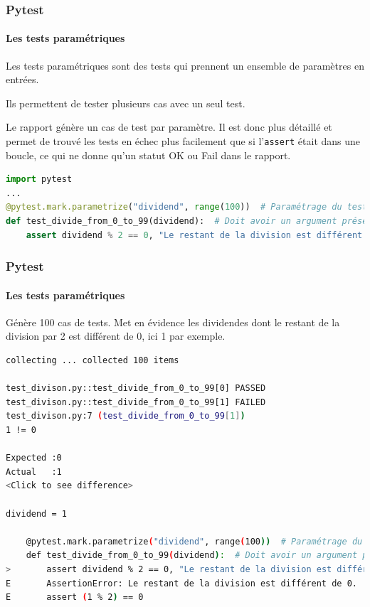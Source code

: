 \documentclass{beamer}
\begin{document}
    \begin{frame}[fragile]
        \frametitle{Pytest}
        \framesubtitle{Les tests paramétriques}
        \transdissolve
        Les tests paramétriques sont des tests qui prennent un ensemble de paramètres en entrées.

        Ils permettent de tester plusieurs cas avec un seul test.

        Le rapport génère un cas de test par paramètre. Il est donc plus détaillé et permet de trouvé
        les tests en échec plus facilement que si l'\lstinline {assert} était dans une boucle, ce qui ne donne qu'un statut OK ou Fail dans le rapport.
        \begin{lstlisting}[language=Python]
import pytest
...
@pytest.mark.parametrize("dividend", range(100))  # Paramétrage du test
def test_divide_from_0_to_99(dividend):  # Doit avoir un argument présent dans le paramétrage
    assert dividend % 2 == 0, "Le restant de la division est différent de 0."
        \end{lstlisting}
    \end{frame}

    \begin{frame}[fragile]
        \frametitle{Pytest}
        \framesubtitle{Les tests paramétriques}
        \transdissolve
        Génère 100 cas de tests. Met en évidence les dividendes dont le restant de la division par 2 est différent de 0, ici 1 par exemple.
        \begin{lstlisting}[language=sh]
collecting ... collected 100 items

test_divison.py::test_divide_from_0_to_99[0] PASSED                      [  1%]
test_divison.py::test_divide_from_0_to_99[1] FAILED                      [  2%]
test_divison.py:7 (test_divide_from_0_to_99[1])
1 != 0

Expected :0
Actual   :1
<Click to see difference>

dividend = 1

    @pytest.mark.parametrize("dividend", range(100))  # Paramétrage du test
    def test_divide_from_0_to_99(dividend):  # Doit avoir un argument présent dans le paramétrage
>       assert dividend % 2 == 0, "Le restant de la division est différent de 0."
E       AssertionError: Le restant de la division est différent de 0.
E       assert (1 % 2) == 0
        \end{lstlisting}
    \end{frame}
\end{document}
